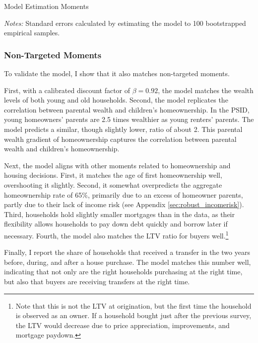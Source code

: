 \documentclass[12pt]{article}
\begin{document}
\begin{table}
	\center 
	\begin{threeparttable}
	\caption{Model Estimation Moments}\label{tab:esttable}
		
	
		\begin{tablenotes}
			\footnotesize
			\textit{Notes:} Standard errors calculated by estimating the model to 100 bootstrapped empirical samples.
		\end{tablenotes}
	\end{threeparttable}
\end{table}


\subsubsection{Non-Targeted Moments}\label{sec:externalval}
To validate the model, I show that it also matches non-targeted moments. 

First, with a calibrated discount factor of $\beta=0.92$, the model matches the wealth levels of both young and old households. Second, the model replicates the correlation between parental wealth and children's homeownership. In the PSID, young homeowners' parents are 2.5 times wealthier as young renters' parents. The model predicts a similar, though slightly lower, ratio of about 2. This parental wealth gradient of homeownership captures the correlation between parental wealth and children's homeownership. 

Next, the model aligns with other moments related to homeownership and housing decisions. First, it matches the age of first homeownership well, overshooting it slightly. Second, it somewhat overpredicts the aggregate homeownership rate of 65\%, primarily due to an excess of homeowner parents, partly due to their lack of income risk (see Appendix \ref{sec:robust_incomerisk}). Third, households hold slightly smaller mortgages than in the data, as their flexibility allows households to pay down debt quickly and borrow later if necessary. Fourth, the model also matches the LTV ratio for buyers well.\footnote{Note that this is not the LTV at origination, but the first time the household is observed as an owner. If a household bought just after the previous survey, the LTV would decrease due to price appreciation, improvements, and mortgage paydown.}

Finally, I report the share of households that received a transfer in the two years before, during, and after a house purchase. The model matches this number well, indicating that not only are the right households purchasing at the right time, but also that buyers are receiving transfers at the right time.
\end{document}
